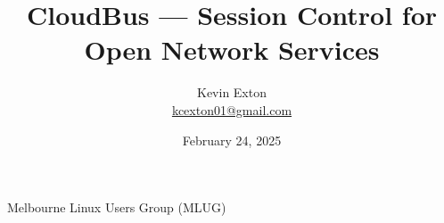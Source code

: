 \title{CloudBus --- Session Control for Open Network Services}
\author[K. Exton]{
	\centering
	Kevin Exton\\
	\href{mailto:kcexton01@gmail.com}{\footnotesize kcexton01@gmail.com}
}
\date{February 24, 2025}
\begin{frame}[plain]
	\titlepage
	\centering
	\footnotesize Melbourne Linux Users Group (MLUG)
\end{frame}